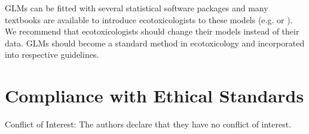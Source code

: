 \documentclass[twocolumn, natbib]{svjour3}
\begin{document}
GLMs can be fitted with several statistical software packages and many textbooks are available to introduce ecotoxicologists to these models (e.g. \citealt{zuur_beginners_2013} or \citealt{quinn_experimental_2009}).
We recommend that ecotoxicologists should change their models instead of their data.
GLMs should become a standard method in ecotoxicology and incorporated into respective guidelines.


\section{Compliance with Ethical Standards}
Conflict of Interest: The authors declare that they have no conflict of interest.



\end{document}
